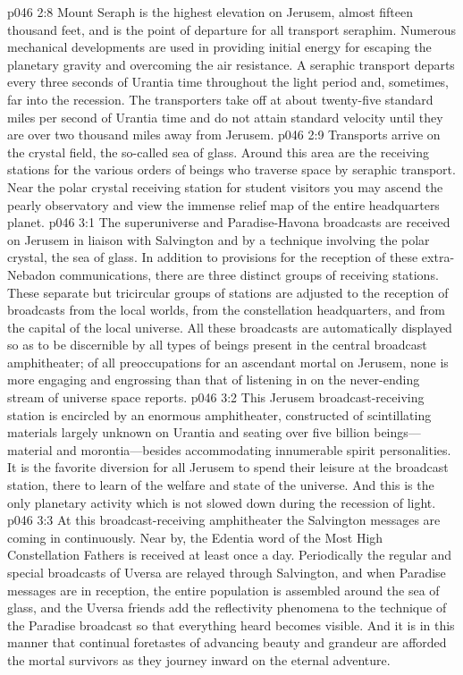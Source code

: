 \pc \vs p046 2:8 Mount Seraph is the highest elevation on Jerusem, almost fifteen thousand feet, and is the point of departure for all transport seraphim. Numerous mechanical developments are used in providing initial energy for escaping the planetary gravity and overcoming the air resistance. A seraphic transport departs every three seconds of Urantia time throughout the light period and, sometimes, far into the recession. The transporters take off at about twenty\hyp{}five standard miles per second of Urantia time and do not attain standard velocity until they are over two thousand miles away from Jerusem.
\vs p046 2:9 Transports arrive on the crystal field, the so\hyp{}called sea of glass. Around this area are the receiving stations for the various orders of beings who traverse space by seraphic transport. Near the polar crystal receiving station for student visitors you may ascend the pearly observatory and view the immense relief map of the entire headquarters planet.
\vs p046 3:1 The superuniverse and Paradise\hyp{}Havona broadcasts are received on Jerusem in liaison with Salvington and by a technique involving the polar crystal, the sea of glass. In addition to provisions for the reception of these extra\hyp{}Nebadon communications, there are three distinct groups of receiving stations. These separate but tricircular groups of stations are adjusted to the reception of broadcasts from the local worlds, from the constellation headquarters, and from the capital of the local universe. All these broadcasts are automatically displayed so as to be discernible by all types of beings present in the central broadcast amphitheater; of all preoccupations for an ascendant mortal on Jerusem, none is more engaging and engrossing than that of listening in on the never\hyp{}ending stream of universe space reports.
\vs p046 3:2 This Jerusem broadcast\hyp{}receiving station is encircled by an enormous amphitheater, constructed of scintillating materials largely unknown on Urantia and seating over five billion beings---material and morontia---besides accommodating innumerable spirit personalities. It is the favorite diversion for all Jerusem to spend their leisure at the broadcast station, there to learn of the welfare and state of the universe. And this is the only planetary activity which is not slowed down during the recession of light.
\vs p046 3:3 At this broadcast\hyp{}receiving amphitheater the Salvington messages are coming in continuously. Near by, the Edentia word of the Most High Constellation Fathers is received at least once a day. Periodically the regular and special broadcasts of Uversa are relayed through Salvington, and when Paradise messages are in reception, the entire population is assembled around the sea of glass, and the Uversa friends add the reflectivity phenomena to the technique of the Paradise broadcast so that everything heard becomes visible. And it is in this manner that continual foretastes of advancing beauty and grandeur are afforded the mortal survivors as they journey inward on the eternal adventure.
